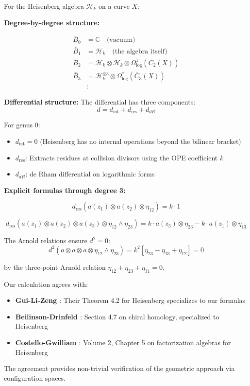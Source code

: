 \begin{theorem}\label{thm:heisenberg-bar-complete}
For the Heisenberg algebra $\mathcal{H}_k$ on a curve $X$:

\textbf{Degree-by-degree structure:}

\begin{align}
\bar{B}_0 &= \mathbb{C} \quad \text{(vacuum)} \\
\bar{B}_1 &= \mathcal{H}_k \quad \text{(the algebra itself)} \\
\bar{B}_2 &= \mathcal{H}_k \otimes \mathcal{H}_k \otimes \Omega^1_{\log}(\overline{C}_2(X)) \\
\bar{B}_3 &= \mathcal{H}_k^{\otimes 3} \otimes \Omega^*_{\log}(\overline{C}_3(X)) \\
&\vdots
\end{align}

\textbf{Differential structure:}
The differential has three components:
$$d = d_{\text{int}} + d_{\text{res}} + d_{dR}$$

For genus 0:
\begin{itemize}
\item $d_{\text{int}} = 0$ (Heisenberg has no internal operations beyond the bilinear bracket)
\item $d_{\text{res}}$: Extracts residues at collision divisors using the OPE coefficient $k$
\item $d_{dR}$: de Rham differential on logarithmic forms
\end{itemize}

\textbf{Explicit formulas through degree 3:}

$$d_{\text{res}}(a(z_1) \otimes a(z_2) \otimes \eta_{12}) = k \cdot 1$$

$$d_{\text{res}}(a(z_1) \otimes a(z_2) \otimes a(z_3) \otimes \eta_{12} \wedge \eta_{23}) = k \cdot a(z_3) \otimes \eta_{23} - k \cdot a(z_1) \otimes \eta_{13}$$

The Arnold relations ensure $d^2 = 0$:
$$d^2(a \otimes a \otimes a \otimes \eta_{12} \wedge \eta_{23}) = k^2[\eta_{23} - \eta_{13} + \eta_{12}] = 0$$

by the three-point Arnold relation $\eta_{12} + \eta_{23} + \eta_{31} = 0$.
\end{theorem}

\begin{remark}\label{rem:heisenberg-literature}
Our calculation agrees with:
\begin{itemize}
\item \textbf{Gui-Li-Zeng \cite{GLZ21}}: Their Theorem 4.2 for Heisenberg specializes to our formulas
\item \textbf{Beilinson-Drinfeld \cite{BD04}}: Section 4.7 on chiral homology, specialized to Heisenberg
\item \textbf{Costello-Gwilliam \cite{CG17}}: Volume 2, Chapter 5 on factorization algebras for Heisenberg
\end{itemize}

The agreement provides non-trivial verification of the geometric approach via configuration spaces.
\end{remark}

